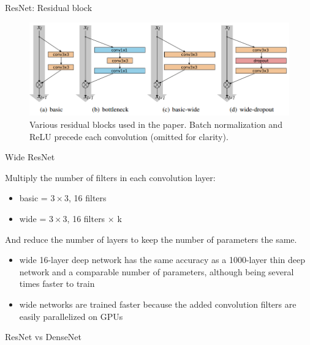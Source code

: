 \documentclass{beamer}
\begin{document}
\begin{frame}{ResNet: Residual block}
\begin{figure}[h]
\includegraphics[width=\textwidth]{img/resnet_blocks}
\caption{Various residual blocks used in the paper. Batch normalization and ReLU precede
each convolution (omitted for clarity). \cite{cit:resnet}}
\end{figure}
\end{frame}
\begin{frame}{Wide ResNet}

Multiply the number of filters in each convolution layer:
\begin{itemize}
\item basic = $3 \times 3$, 16 filters
\item wide = $3 \times 3$, 16 filters $\times$ k
\end{itemize}
And reduce the number of layers to keep the number of parameters the same.

\begin{itemize}
\item wide 16-layer deep network has the same accuracy as a 1000-layer thin deep network and a comparable
number of parameters, although being several times faster to train
\item wide networks are trained faster because the added convolution filters are easily parallelized on GPUs
\end{itemize}



\end{frame}
\begin{frame}{ResNet vs DenseNet}

\end{frame}
\end{document}
